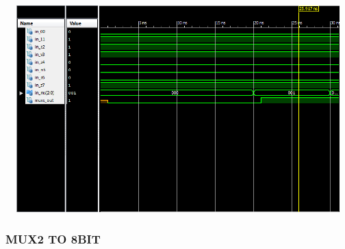 \documentclass{article}
\begin{document}
\includegraphics[width=16cm, height=8cm]{test_mux8_1bit.png}
\pagebreak

\subsubsection{MUX2 TO 8BIT}\label{sec:intro}
\end{document}

